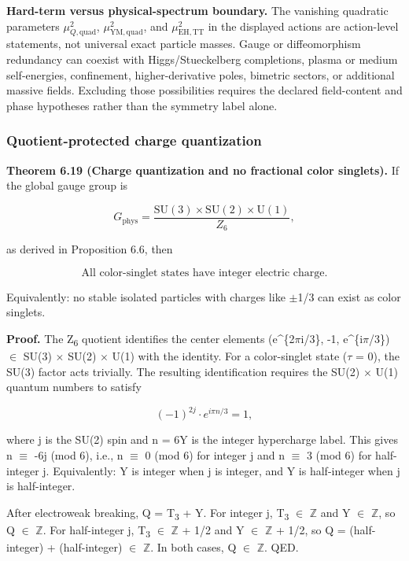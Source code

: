 \textbf{Hard-term versus physical-spectrum boundary.} The vanishing quadratic parameters
\(\mu_{Q,\mathrm{quad}}^2\), \(\mu_{\mathrm{YM},\mathrm{quad}}^2\), and
\(\mu_{\mathrm{EH},\mathrm{TT}}^2\) in the displayed actions are action-level statements, not
universal exact particle masses. Gauge or diffeomorphism redundancy can coexist with
Higgs/Stueckelberg completions, plasma or medium self-energies, confinement, higher-derivative
poles, bimetric sectors, or additional massive fields. Excluding those possibilities requires the
declared field-content and phase hypotheses rather than the symmetry label alone.

\subsubsection{Quotient-protected charge quantization}\label{612-mass-predictions-from-symmetry}

\textbf{Theorem 6.19 (Charge quantization and no fractional color singlets).} If the global gauge group is

\[
G_{\mathrm{phys}} = \frac{\mathrm{SU}(3) \times \mathrm{SU}(2) \times \mathrm{U}(1)}{Z_6},
\]

as derived in Proposition 6.6, then

\[
\text{All color-singlet states have integer electric charge.}
\]

Equivalently: no stable isolated particles with charges like \ensuremath{\pm}1/3 can exist as color singlets.

\textbf{Proof.} The Z\textsubscript{6} quotient identifies the center elements (e\^{}\{2\ensuremath{\pi}i/3\}, -1, e\^{}\{i\ensuremath{\pi}/3\}) \ensuremath{\in} SU(3) \ensuremath{\times} SU(2) \ensuremath{\times} U(1) with the identity. For a color-singlet state (\ensuremath{\tau} = 0), the SU(3) factor acts trivially. The resulting identification requires the SU(2) \ensuremath{\times} U(1) quantum numbers to satisfy

\[
(-1)^{2j} \cdot e^{i\pi n/3} = 1,
\]

where j is the SU(2) spin and n = 6Y is the integer hypercharge label. This gives n \ensuremath{\equiv} -6j (mod 6), i.e., n \ensuremath{\equiv} 0 (mod 6) for integer j and n \ensuremath{\equiv} 3 (mod 6) for half-integer j. Equivalently: Y is integer when j is integer, and Y is half-integer when j is half-integer.

After electroweak breaking, Q = T\textsubscript{3} + Y. For integer j, T\textsubscript{3} \ensuremath{\in} \ensuremath{\mathbb{Z}} and Y \ensuremath{\in} \ensuremath{\mathbb{Z}}, so Q \ensuremath{\in} \ensuremath{\mathbb{Z}}. For half-integer j, T\textsubscript{3} \ensuremath{\in} \ensuremath{\mathbb{Z}} + 1/2 and Y \ensuremath{\in} \ensuremath{\mathbb{Z}} + 1/2, so Q = (half-integer) + (half-integer) \ensuremath{\in} \ensuremath{\mathbb{Z}}. In both cases, Q \ensuremath{\in} \ensuremath{\mathbb{Z}}. QED.

